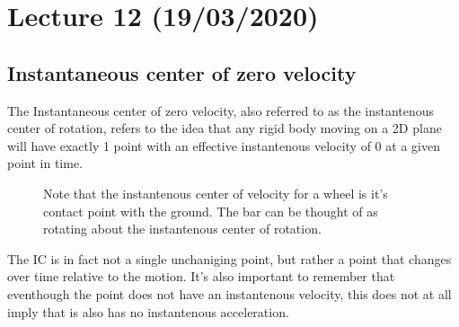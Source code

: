 \documentclass[11pt, a4paper]{article}
\begin{document}
\setcounter{section}{11}
\section{Lecture 12 (19/03/2020)}
\subsection{Instantaneous center of zero velocity}
The Instantaneous center of zero velocity, also referred to as the instantenous center of rotation, refers to the idea that any rigid body moving on a 2D plane will have exactly 1 point with an effective instantenous velocity of 0 at a given point in time.
\begin{figure}[h]
  \centering
  \qquad \qquad \qquad
  \caption{Note that the instantenous center of velocity for a wheel is it's contact point with the ground. The bar can be thought of as rotating about the instantenous center of rotation.}
\end{figure}
The IC is in fact not a single unchaniging point, but rather a point that changes over time relative to the motion. It's also important to remember that eventhough the point does not have an instantenous velocity, this does not at all imply that is also has no instantenous acceleration.
\end{document}
